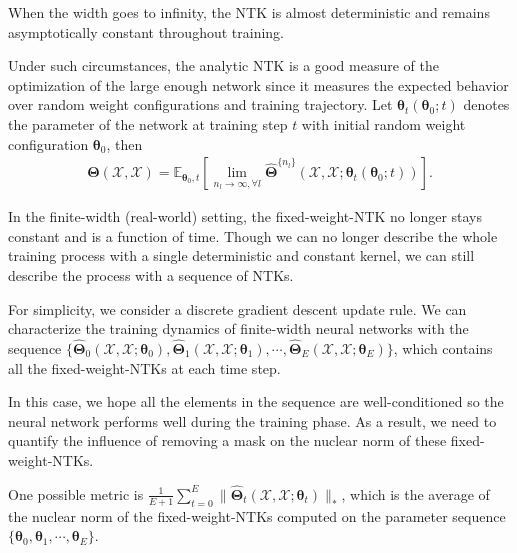 \documentclass{article} %
\begin{document}
When the width goes to infinity, the NTK is almost deterministic and remains asymptotically constant throughout training. 

Under such circumstances, the analytic NTK is a good measure of the optimization of the large enough network since it measures the expected behavior over random weight configurations and training trajectory. Let 
$\boldsymbol{\theta}_t(\boldsymbol{\theta}_0;t)$ denotes the parameter of the network at training step $t$ with initial random weight configuration $\boldsymbol{\theta}_0$, then
\begin{align}
    \boldsymbol{\Theta}(\mathcal{X},\mathcal{X})
=
\mathbb{E}_{\boldsymbol{\theta}_0, t}
\left[ \underset{ n_l\rightarrow\infty, \forall l}{\lim}
\hat{\boldsymbol{\Theta}}^{\{n_l\}}(\mathcal{X},\mathcal{X}; \boldsymbol{\theta}_t(\boldsymbol{\theta}_0;t))\right].
\end{align}

In the finite-width (real-world) setting, the fixed-weight-NTK no longer stays constant and is a function of time. Though we can no longer describe the whole training process with a single deterministic and constant kernel, we can still describe the process with a sequence of NTKs.


For simplicity, we consider a discrete gradient descent update rule. We can characterize the training dynamics of finite-width neural networks with the sequence $\{\hat{\boldsymbol{\Theta}}_0(\mathcal{X},\mathcal{X}; \boldsymbol{\theta}_0), \hat{\boldsymbol{\Theta}}_1(\mathcal{X},\mathcal{X}; \boldsymbol{\theta}_1), \cdots, \hat{\boldsymbol{\Theta}}_E(\mathcal{X},\mathcal{X}; \boldsymbol{\theta}_E)\}$, which contains all the fixed-weight-NTKs at each time step. 


In this case, we hope all the elements in the sequence are well-conditioned so the neural network performs well during the training phase. As a result, we need to quantify the influence of removing a mask on the nuclear norm of these fixed-weight-NTKs. 

One possible metric is  
$ \frac{1}{E+1} \sum_{t=0}^{E} \|\hat{\boldsymbol{\Theta}}_t(\mathcal{X},\mathcal{X}; \boldsymbol{\theta}_t)\|_{*}$, which is the average of the nuclear norm of the fixed-weight-NTKs computed on the parameter sequence $\{\boldsymbol{\theta}_0,\boldsymbol{\theta}_1,\cdots,\boldsymbol{\theta}_E \}$. 
\end{document}
